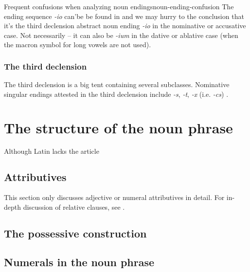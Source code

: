 \documentclass[a4paper, oneside]{report}
\newcommand*{\citesec}[1]{\S~{#1}}
\newcommand{\form}[1]{\emph{#1}}
\begin{document}
\begin{table}[H]
    \caption{Declension endings; Roman numerals are declension classes}
    \label{tbl:declension-ending-nouns-list}
    \centering
    
\end{table}

\begin{learnbox}{Frequent confusions when analyzing noun endings}{noun-ending-confusion}
    The ending sequence \form{-io} can'be be found in 
    and we may hurry to the conclusion 
    that it's the third declension abstract noun ending \form{-io} 
    in the nominative or accusative case.
    Not necessarily -- 
    it can also be \form{-ium} in the dative or ablative case 
    (when the macron symbol for long vowels are not used).
\end{learnbox}

\subsubsection{The third declension}\label{sec:np.inflection.3}

The third declension is a big tent containing several subclasses.
Nominative singular endings attested in the third declension
include \form{-s}, \form{-t}, \form{-x} (i.e. \form{-cs}) \citep[\citesec{53}]{allen1903allen}.

\section{The structure of the noun phrase}

Although Latin lacks the article 

\subsection{Attributives}

This section only discusses adjective or numeral attributives in detail.
For in-depth discussion of relative clauses, see .


\subsection{The possessive construction}

\subsection{Numerals in the noun phrase}
\end{document}
